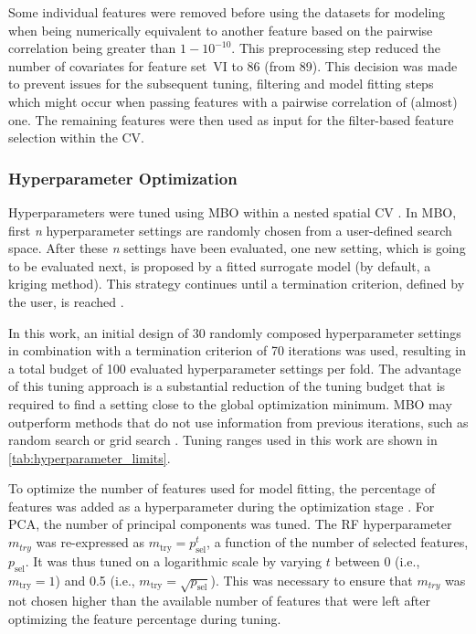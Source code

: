 \documentclass[remotesensing,article,submit,moreauthors,pdftex]{Definitions/mdpi}
\begin{document}
Some individual features were removed before using the datasets for modeling when being numerically equivalent to another feature based on the pairwise correlation being greater than $1 - 10^{-10}$.
This preprocessing step reduced the number of covariates for feature set~VI to 86 (from 89).
This decision was made to prevent issues for the subsequent tuning, filtering and model fitting steps which might occur when passing features with a pairwise correlation of (almost) one.
The remaining features were then used as input for the filter-based feature selection within the CV.

\subsubsection{Hyperparameter Optimization}

Hyperparameters were tuned using \ac{MBO} within a nested spatial \ac{CV} \cite{mlrmbo, binder2020, schratz2019}.
In MBO, first \textit{n} hyperparameter settings are randomly chosen from a user-defined search space.
After these \textit{n} settings have been evaluated, one new setting, which is going to be evaluated next, is proposed by a fitted surrogate model (by default, a kriging method).
This strategy continues until a termination criterion, defined by the user, is reached \cite{hutter2011, jones1998}.

In this work, an initial design of 30 randomly composed hyperparameter settings in combination with a termination criterion of 70 iterations was used, resulting in a total budget of 100 evaluated hyperparameter settings per fold.
The advantage of this tuning approach is a substantial reduction of the tuning budget that is required to find a setting close to the global optimization minimum.
\ac{MBO} may outperform methods that do not use information from previous iterations, such as random search or grid search \cite{bergstra2012}.
Tuning ranges used in this work are shown in \autoref{tab:hyperparameter_limits}.

To optimize the number of features used for model fitting, the percentage of features was added as a hyperparameter during the optimization stage \cite{binder2020}.
For \ac{PCA}, the number of principal components was tuned.
The RF hyperparameter \texttt{\(m_{try}\)} was re-expressed as $m_\textrm{try} = p_\textrm{sel}^t$, a function of the number of selected features, $p_\textrm{sel}$.
It was thus tuned on a logarithmic scale by varying $t$ between 0 (i.e., $m_\textrm{try} = 1$) and 0.5 (i.e., $m_\textrm{try}=\sqrt{p_\textrm{sel}}$).
This was necessary to ensure that \texttt{\(m_{try}\)} was not chosen higher than the available number of features that were left after optimizing the feature percentage during tuning.
\end{document}
